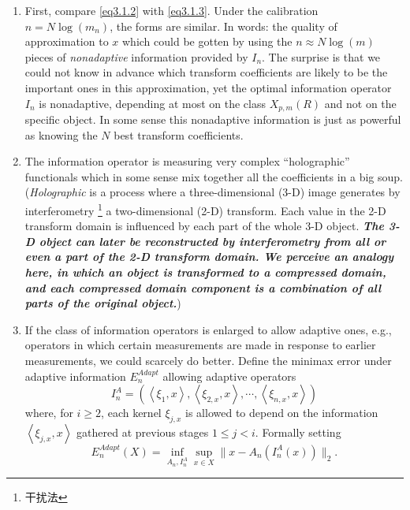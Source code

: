 \begin{enumerate}
    \item First, compare \cref{eq3.1.2} with \cref{eq3.1.3}. Under the calibration $n = N\log(m_n)$, the forms are similar. In words: the quality of approximation to $x$ which could be gotten by using the $n \approx N \log(m)$ pieces of \emph{\textcolor[rgb]{1,0,0}{nonadaptive}} information provided by $I_n$. The surprise is that we could not know in advance which transform coefficients are likely to be the important ones in this approximation, yet the optimal information operator $I_n$ is nonadaptive, depending at most on the class $X_{p,m}(R)$ and not on the specific object. In some sense this nonadaptive information is just as powerful as knowing the $N$ best transform coefficients.
    \item The information operator is measuring very complex ``holographic'' functionals which in some sense mix together all the coefficients in a big soup. (\emph{\textcolor[rgb]{1,0,0}{Holographic}} is a process where a three-dimensional (3-D) image generates by interferometry \footnote{干扰法} a two-dimensional (2-D) transform. Each value in the 2-D transform domain is influenced by each part of the whole 3-D object. \emph{\textbf{\textcolor[rgb]{1,0,0}{The 3-D object can later be reconstructed by interferometry from all or even a part of the 2-D transform domain. We perceive an analogy here, in which an object is transformed to a compressed domain, and each compressed domain component is a combination of all parts of the original object.}}})
    \item  If the class of information operators is enlarged to allow adaptive ones, e.g., operators in which certain measurements are made in response to earlier measurements, we could scarcely do better. Define the minimax error under adaptive information $E_n^{Adapt}$ allowing adaptive operators 
        \begin{equation*}
            I_n^A = (\left<\xi_1,x\right>,\left<\xi_{2,x},x\right>,\cdots,\left<\xi_{n,x},x\right>)
        \end{equation*}
        where, for $i\geq 2$, each kernel $\xi_{j,x}$ is allowed to depend on the information $\left<\xi_{j,x},x\right>$ gathered at previous stages $1 \leq j < i$. Formally setting
        \begin{equation*}
            E_n^{Adapt}(X) = \inf\limits_{A_n,I_n^A} \sup\limits_{x \in X} \|x-A_n \left(I_n^A(x)\right)\|_2.
        \end{equation*}
        \begin{theorem}

\end{theorem}
\end{enumerate}
